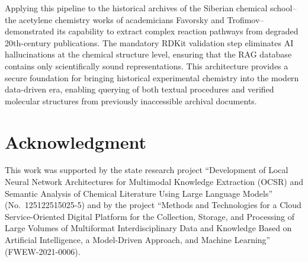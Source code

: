 \documentclass[conference]{IEEEtran}
\begin{document}
Applying this pipeline to the historical archives of the Siberian chemical school--the acetylene chemistry works of academicians Favorsky and Trofimov--demonstrated its capability to extract complex reaction pathways from degraded 20th-century publications. The mandatory RDKit validation step eliminates AI hallucinations at the chemical structure level, ensuring that the RAG database contains only scientifically sound representations. This architecture provides a secure foundation for bringing historical experimental chemistry into the modern data-driven era, enabling querying of both textual procedures and verified molecular structures from previously inaccessible archival documents.

\section*{Acknowledgment}

This work was supported by the state research project ``Development of Local Neural Network Architectures for Multimodal Knowledge Extraction (OCSR) and Semantic Analysis of Chemical Literature Using Large Language Models'' (No.~125122515025-5) and by the project ``Methods and Technologies for a Cloud Service-Oriented Digital Platform for the Collection, Storage, and Processing of Large Volumes of Multiformat Interdisciplinary Data and Knowledge Based on Artificial Intelligence, a Model-Driven Approach, and Machine Learning'' (FWEW-2021-0006).
\end{document}
